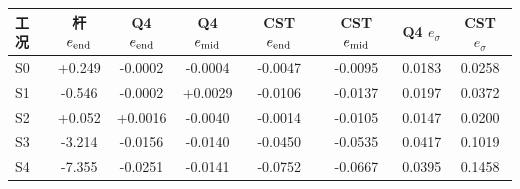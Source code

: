\begin{tabular}{@{}lS[table-format=+1.2]S[table-format=+1.4]S[table-format=+1.4]S[table-format=+1.4]S[table-format=+1.4]S[table-format=1.4]S[table-format=1.4]@{}}
\toprule
工况 & {杆 $e_{\rm end}$} & {Q4 $e_{\rm end}$} & {Q4 $e_{\rm mid}$} & {CST $e_{\rm end}$} & {CST $e_{\rm mid}$} & {Q4 $e_\sigma$} & {CST $e_\sigma$} \\
\midrule
S0 & +0.249 & -0.0002 & -0.0004 & -0.0047 & -0.0095 & 0.0183 & 0.0258 \\
S1 & -0.546 & -0.0002 & +0.0029 & -0.0106 & -0.0137 & 0.0197 & 0.0372 \\
S2 & +0.052 & +0.0016 & -0.0040 & -0.0014 & -0.0105 & 0.0147 & 0.0200 \\
S3 & -3.214 & -0.0156 & -0.0140 & -0.0450 & -0.0535 & 0.0417 & 0.1019 \\
S4 & -7.355 & -0.0251 & -0.0141 & -0.0752 & -0.0667 & 0.0395 & 0.1458 \\
\bottomrule
\end{tabular}

